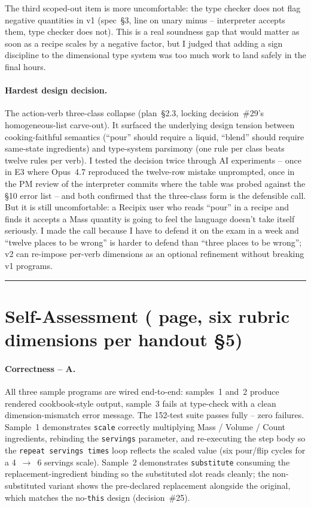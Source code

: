 \documentclass[11pt,a4paper]{article}
\begin{document}
The third scoped-out item is more uncomfortable: the type checker does
not flag negative quantities in v1 (spec~\S3, line on unary minus --
interpreter accepts them, type checker does not). This is a real
soundness gap that would matter as soon as a recipe scales by a
negative factor, but I judged that adding a sign discipline to the
dimensional type system was too much work to land safely in the
final hours.

\paragraph{Hardest design decision.} The action-verb three-class
collapse (plan~\S2.3, locking decision~\#29's homogeneous-list
carve-out). It surfaced the underlying design tension between
cooking-faithful semantics (``pour'' should require a liquid,
``blend'' should require same-state ingredients) and type-system
parsimony (one rule per class beats twelve rules per verb). I tested
the decision twice through AI experiments -- once in E3 where Opus~4.7
reproduced the twelve-row mistake unprompted, once in the PM review of
the interpreter commits where the table was probed against the
\S10 error list -- and both confirmed that the three-class form is
the defensible call. But it is still uncomfortable: a Recipix user
who reads ``pour'' in a recipe and finds it accepts a Mass quantity
is going to feel the language doesn't take itself seriously. I made
the call because I have to defend it on the exam in a week and
``twelve places to be wrong'' is harder to defend than ``three places
to be wrong''; v2 can re-impose per-verb dimensions as an optional
refinement without breaking v1 programs.

\vspace{1em}
\noindent\rule{\textwidth}{0.4pt}

\section{Self-Assessment (\textonehalf{} page, six rubric dimensions per handout \S5)}

\paragraph{Correctness -- A.} All three sample programs are wired
end-to-end: samples~1 and~2 produce rendered cookbook-style output,
sample~3 fails at type-check with a clean dimension-mismatch error
message. The 152-test suite passes fully -- zero failures. Sample~1
demonstrates \texttt{scale} correctly multiplying Mass / Volume / Count
ingredients, rebinding the \texttt{servings} parameter, and re-executing
the step body so the \texttt{repeat servings times} loop reflects the
scaled value (six pour/flip cycles for a 4~$\to$~6 servings scale).
Sample~2 demonstrates \texttt{substitute} consuming the
replacement-ingredient binding so the substituted slot reads cleanly;
the non-substituted variant shows the pre-declared replacement
alongside the original, which matches the no-\texttt{this} design
(decision~\#25).
\end{document}
